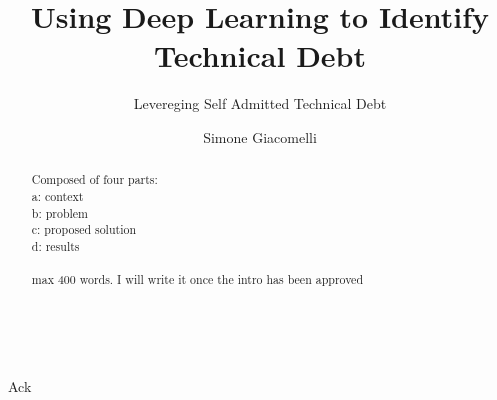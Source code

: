 \documentclass[11pt, mscthesis]{usiinfthesis}
\title{Using Deep Learning to Identify Technical Debt} %
\subtitle{Levereging Self Admitted Technical Debt} %
\author{Simone Giacomelli} %
\begin{document}
\maketitle %

\frontmatter %

\begin{abstract}
Composed of four parts: \\
a: context\\
b: problem\\
c: proposed solution\\
d: results\\
\\
max 400 words.
I will write it once the intro has been approved
\\
\\
\\

\end{abstract}



\begin{acknowledgements}
Ack 
\end{acknowledgements}

\tableofcontents 
\listoffigures %
\listoftables %

\mainmatter
















\nocite{*}
\backmatter


%
%
%
%



\printbibliography
\end{document}

